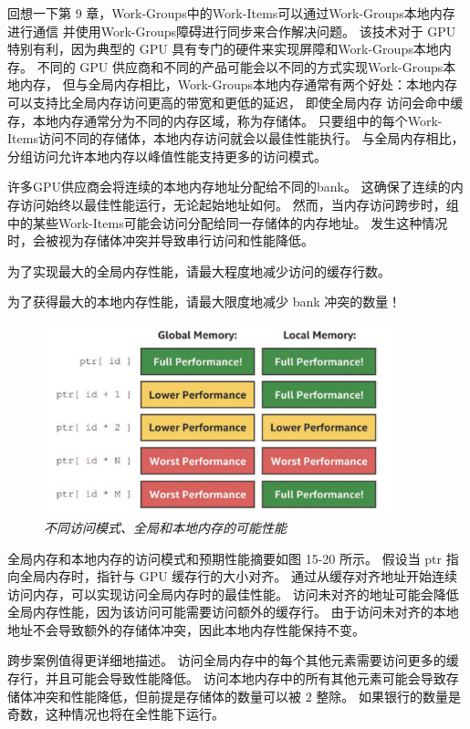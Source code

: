 回想一下第 9 章，Work-Groups中的Work-Items可以通过Work-Groups本地内存进行通信
并使用Work-Groups障碍进行同步来合作解决问题。 
该技术对于 GPU 特别有利，因为典型的 GPU 具有专门的硬件来实现屏障和Work-Groups本地内存。 
不同的 GPU 供应商和不同的产品可能会以不同的方式实现Work-Groups本地内存，
但与全局内存相比，Work-Groups本地内存通常有两个好处：本地内存可以支持比全局内存访问更高的带宽和更低的延迟，
即使全局内存 访问会命中缓存，本地内存通常分为不同的内存区域，称为存储体。 
只要组中的每个Work-Items访问不同的存储体，本地内存访问就会以最佳性能执行。 
与全局内存相比，分组访问允许本地内存以峰值性能支持更多的访问模式。

许多GPU供应商会将连续的本地内存地址分配给不同的bank。 这确保了连续的内存访问始终以最佳性能运行，无论起始地址如何。 
然而，当内存访问跨步时，组中的某些Work-Items可能会访问分配给同一存储体的内存地址。 
发生这种情况时，会被视为存储体冲突并导致串行访问和性能降低。

\begin{remark}
为了实现最大的全局内存性能，请最大程度地减少访问的缓存行数。

为了获得最大的本地内存性能，请最大限度地减少 bank 冲突的数量！
\end{remark}

\begin{figure}[H]
	\centering
	\includegraphics[width=0.9\textwidth]{figs/F15.20.png}
	\caption{\textit{不同访问模式、全局和本地内存的可能性能}}
\end{figure}

全局内存和本地内存的访问模式和预期性能摘要如图 15-20 所示。 
假设当 ptr 指向全局内存时，指针与 GPU 缓存行的大小对齐。 
通过从缓存对齐地址开始连续访问内存，可以实现访问全局内存时的最佳性能。 
访问未对齐的地址可能会降低全局内存性能，因为该访问可能需要访问额外的缓存行。 
由于访问未对齐的本地地址不会导致额外的存储体冲突，因此本地内存性能保持不变。

跨步案例值得更详细地描述。 访问全局内存中的每个其他元素需要访问更多的缓存行，并且可能会导致性能降低。 
访问本地内存中的所有其他元素可能会导致存储体冲突和性能降低，但前提是存储体的数量可以被 2 整除。 
如果银行的数量是奇数，这种情况也将在全性能下运行。

